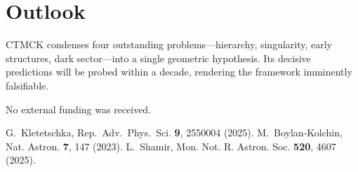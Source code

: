 \documentclass[reprint,amsmath,amssymb,aps,prd,nofootinbib]{revtex4-2}
\begin{document}
\section{Outlook}
CTMCK condenses four outstanding problems—hierarchy, singularity, early structures, dark sector—into a single geometric hypothesis.  Its decisive predictions will be probed within a decade, rendering the framework imminently falsifiable.

\begin{acknowledgments}
No external funding was received.
\end{acknowledgments}

\begin{thebibliography}{99}
G.~Kletetschka, Rep.~Adv.~Phys.~Sci. \textbf{9}, 2550004 (2025).
M.~Boylan‑Kolchin, Nat. Astron. \textbf{7}, 147 (2023).
L.~Shamir, Mon. Not. R. Astron. Soc. \textbf{520}, 4607 (2025).
\end{thebibliography}
\end{document}
